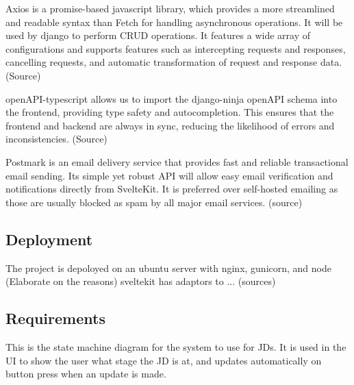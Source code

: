 Axios is a promise-based javascript library, which provides a more streamlined and readable syntax than Fetch for handling asynchronous operations. It will be used by django to perform CRUD operations. It features a wide array of configurations and supports features such as intercepting requests and responses, cancelling requests, and automatic transformation of request and response data. (Source)

openAPI-typescript allows us to import the django-ninja openAPI schema into the frontend, providing type safety and autocompletion. This ensures that the frontend and backend are always in sync, reducing the likelihood of errors and inconsistencies. (Source)

Postmark is an email delivery service that provides fast and reliable transactional email sending. Its simple yet robust API will allow easy email verification and notifications directly from SvelteKit. It is preferred over self-hosted emailing as those are usually blocked as spam by all major email services. (source)

\subsection{Deployment}
The project is depoloyed on an ubuntu server with nginx, gunicorn, and node (Elaborate on the reasons) sveltekit has adaptors to ... (sources)

\subsection{Requirements}
This is the state machine diagram for the system to use for JDs. It is used in the UI to show the user what stage the JD is at, and updates automatically on button press when an update is made.

\noindent
{}

\noindent
{}